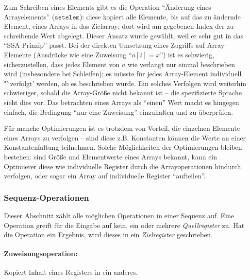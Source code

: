 \documentclass[twoside,a4paper,fleqn,12pt]{article}
\begin{document}
Zum Schreiben eines Elements gibt es die Operation "`Änderung eines Arrayelements"' ($\mathtt{setelem}$):
diese kopiert alle Elemente, bis auf das zu ändernde Element, eines Arrays in das Zielarray;
dort wird am gegebenen Index der zu schreibende Wert abgelegt.
Dieser Ansatz wurde gewählt, weil er sehr gut in das "`SSA-Prinzip"' passt.
Bei der direkten Umsetzung eines Zugriffs auf Array-Elemente (Ausdrücke wie eine Zuweisung "`$a[i] = x$"') ist es schwierig, sicherzustellen, dass
jedes Element von $a$ wie verlangt nur einmal beschrieben wird (insbesondere bei Schleifen); es
müsste für jedes Array-Element individuell "`verfolgt' werden, ob es beschrieben wurde.
Ein solches Verfolgen wird weiterhin schwieriger, sobald die Array-Größe nicht bekannt ist
-- die spezifizierte Sprache sieht dies vor. Das betrachten eines Arrays als "`einen"' Wert macht es hingegen einfach,
die Bedingung "`nur eine Zuweisung"' einzuhalten und zu überprüfen.

Für manche Optimierungen ist es trotzdem von Vorteil, die einzelnen Elemente eines Arrays zu verfolgen -- sind diese
z.B. Konstanten können die Werte an einer Konstantenfaltung teilnehmen. Solche Möglichkeiten der Optimierungen
bleiben bestehen: sind Größe und Elementwerte eines Arrays bekannt, kann ein Optimierer diese wie individuelle
Register durch die Arrayoperationen hindurch verfolgen, oder sogar ein Array auf individuelle Register "`aufteilen"'.

\subsubsection{Sequenz-Operationen}

Dieser Abschnitt zählt alle möglichen Operationen in einer Sequenz auf. Eine Operation greift für die Eingabe auf kein, ein oder mehrere
\emph{Quellregister} zu. Hat die Operation ein Ergebnis, wird dieses in ein \emph{Zielregister} geschrieben. 


\paragraph{Zuweisungsoperation:} Kopiert Inhalt eines Registers in ein anderes.
\end{document}

